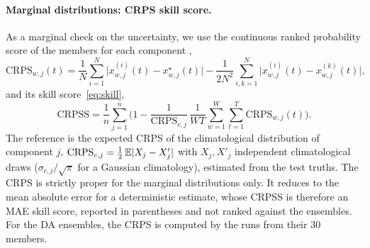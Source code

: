 \paragraph{Marginal distributions: CRPS skill score.}
As a marginal check on the uncertainty, we use the continuous ranked probability
score of the members for each component \cite{gneiting_strictly_2007},
\begin{equation}\label{eq:crps}
  \mathrm{CRPS}_{w,j}(t) = \frac{1}{N}\sum_{i=1}^{N} \big|x^{(i)}_{w,j}(t) - x^\star_{w,j}(t)\big|
  - \frac{1}{2N^2}\sum_{i,k=1}^{N} \big|x^{(i)}_{w,j}(t) - x^{(k)}_{w,j}(t)\big| ,
\end{equation}
and its skill score~\eqref{eq:skill},
\begin{equation}\label{eq:crpss}
  \mathrm{CRPSS} = \frac{1}{n}\sum_{j=1}^{n}
  \Big(1 - \frac{1}{\mathrm{CRPS}_{c,j}}\,\frac{1}{WT}\sum_{w=1}^{W}\sum_{t=1}^{T}
  \mathrm{CRPS}_{w,j}(t)\Big).
\end{equation}
The reference is the expected CRPS of the climatological distribution of component $j$,
$\mathrm{CRPS}_{c,j} = \tfrac12\,\mathbb{E}|X_j - X'_j|$ with $X_j, X'_j$ independent
climatological draws ($\sigma_{c,j}/\sqrt{\pi}$ for a Gaussian climatology), estimated
from the test truths. The CRPS is strictly proper for the
marginal distributions only. It reduces to the mean absolute error for a deterministic
estimate, whose CRPSS is therefore an MAE skill score, reported in parentheses and not
ranked against the ensembles.
For the DA ensembles, the CRPS is computed by the runs from their 30 members.

